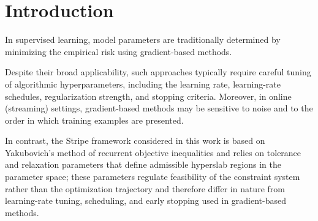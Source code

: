 \documentclass[a4paper,fleqn]{cas-sc}
\newtheorem{theorem}{Theorem}
\newtheorem{lemma}[theorem]{Lemma}
\begin{document}




\section{Introduction}
\label{sec:intro}


In supervised learning, model parameters are traditionally determined by minimizing
the empirical risk using gradient-based methods.

Despite their broad applicability, such approaches typically require careful tuning of algorithmic hyperparameters, including the learning rate, learning-rate schedules, regularization strength, and stopping criteria.
Moreover, in online (streaming) settings, gradient-based methods may be sensitive
to noise and to the order in which training examples are presented.

In contrast, the Stripe framework considered in this work is based on Yakubovich’s method of recurrent objective inequalities and relies on tolerance and relaxation parameters that define admissible hyperslab regions in the parameter space; these parameters regulate feasibility of the constraint system rather than the optimization trajectory and therefore differ in nature from learning-rate tuning, scheduling, and early stopping used in gradient-based methods.
\end{document}
